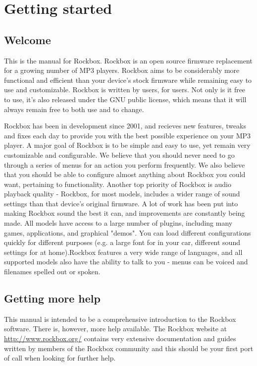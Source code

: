 \chapter{Getting started}
\section{Welcome}
This is the manual for Rockbox. Rockbox is an open source firmware replacement
for a growing number of MP3 players. Rockbox aims to be considerably more
functional and efficient than your device's stock firmware while remaining easy
to use and customizable. Rockbox is written by users, for users. Not only is it
free to use, it's also released under the GNU public license, which means that
it will always remain free to both use and to change.

Rockbox has been in development since 2001, and recieves new features, tweaks
and fixes each day to provide you with the best possible experience on your MP3
player. A major goal of Rockbox is to be simple and easy to use, yet remain very
customizable and configurable. We believe that you should never need to go
through a series of menus for an action you perform frequently. We also believe
that you should be able to configure almost anything about Rockbox you could
want, pertaining to functionality. Another top priority of Rockbox is audio
playback quality - Rockbox, for most models, includes a wider range of sound
settings than that device's original firmware. A lot of work has been put into
making Rockbox sound the best it can, and improvements are constantly being made.
All models have access to a large number of plugins, including many games,
applications, and graphical "demos". You can load different configurations
quickly for different purposes (e.g. a large font for in your car, different
sound settings for at home).Rockbox features a very wide range of languages, and
all supported models also have the ability to talk to you - menus can be voiced
and filenames spelled out or spoken.

\section{Getting more help}
This manual is intended to be a comprehensive introduction to the Rockbox
software.
  There is, however, more help available.  The Rockbox website at
\url{http://www.rockbox.org/} contains very extensive documentation and guides
written by members of the Rockbox community and this should be your first port
of call when looking for further help.

